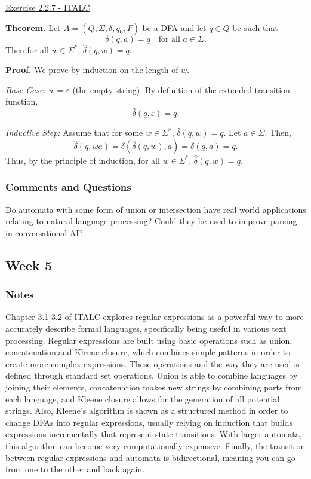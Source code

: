 \documentclass{article}
\theoremstyle{theorem}
\theoremstyle{definition}
\theoremstyle{remark}
\begin{document}
\underline{Exercise 2.2.7 - ITALC}

\textbf{Theorem.} Let \(A = (Q,\Sigma,\delta,q_0,F)\) be a DFA and let \(q \in Q\) be such that 
\[
\delta(q,a) = q \quad \text{for all } a \in \Sigma.
\]
Then for all \(w \in \Sigma^*\), \(\hat{\delta}(q,w) = q\).

\textbf{Proof.} We prove by induction on the length of \(w\).

\textit{Base Case:} \(w = \varepsilon\) (the empty string).  
By definition of the extended transition function,
\[
\hat{\delta}(q,\varepsilon) = q.
\]

\textit{Inductive Step:} Assume that for some \(w \in \Sigma^*\), \(\hat{\delta}(q,w) = q\).  
Let \(a \in \Sigma\). Then,
\[
\hat{\delta}(q, wa) = \delta(\hat{\delta}(q, w), a) = \delta(q, a) = q.
\]
Thus, by the principle of induction, for all \(w \in \Sigma^*\), \(\hat{\delta}(q,w) = q\).


\subsubsection*{Comments and Questions}

Do automata with some form of union or intersection have real world applications relating to natural language processing? Could they be used to improve parsing in conversational AI? 

\subsection{Week 5}

\subsubsection*{Notes}
Chapter 3.1-3.2 of ITALC explores regular expressions as a powerful way to more accurately describe formal languages, specifically being useful in various text processing. Regular expressions are built using basic operations such as union, concatenation,and Kleene closure, which combines simple patterns in order to create more complex expressions. These operations and the way they are used is defined through standard set operations. Union is able to combine languages by joining their elements, concatenation makes new strings by combining parts from each language, and Kleene closure allows for the generation of all potential strings. Also, Kleene's algorithm is shown as a structured method in order to change DFAs into regular expressions, usually relying on induction that builds expressions incrementally that represent state transitions. With larger automata, this algorithm can become very computationally expensive. Finally, the transition between regular expressions and automata is bidirectional, meaning you can go from one to the other and back again. 
\end{document}
